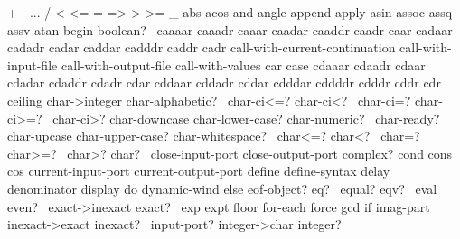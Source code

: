 {\cf *}                       {\cf +}
{\cf -}                       {\cf ...}
{\cf /}                       {\cf <}
{\cf <=}                      {\cf =}
{\cf =>}                      {\cf >}
{\cf >=}                      {\cf \_}
{\cf abs}                     {\cf acos}
{\cf and}                     {\cf angle}
{\cf append}                  {\cf apply}
{\cf asin}                    {\cf assoc}
{\cf assq}                    {\cf assv}
{\cf atan}                    {\cf begin}
{\cf boolean?\ }               {\cf caaaar}
{\cf caaadr}                  {\cf caaar}
{\cf caadar}                  {\cf caaddr}
{\cf caadr}                   {\cf caar}
{\cf cadaar}                  {\cf cadadr}
{\cf cadar}                   {\cf caddar}
{\cf cadddr}                  {\cf caddr}
{\cf cadr}
{\cf call-with-current-continuation}
{\cf call-with-input-file}    {\cf call-with-output-file}
{\cf call-with-values}        {\cf car}
{\cf case}                    {\cf cdaaar}
{\cf cdaadr}                  {\cf cdaar}
{\cf cdadar}                  {\cf cdaddr}
{\cf cdadr}                   {\cf cdar}
{\cf cddaar}                  {\cf cddadr}
{\cf cddar}                   {\cf cdddar}
{\cf cddddr}                  {\cf cdddr}
{\cf cddr}                    {\cf cdr}
{\cf ceiling}                 {\cf char->integer}
{\cf char-alphabetic?\ }       {\cf char-ci<=?}
{\cf char-ci<?\ }              {\cf char-ci=?}
{\cf char-ci>=?\ }             {\cf char-ci>?}
{\cf char-downcase}           {\cf char-lower-case?}
{\cf char-numeric?\ }          {\cf char-ready?}
{\cf char-upcase}             {\cf char-upper-case?}
{\cf char-whitespace?\ }       {\cf char<=?}
{\cf char<?\ }                 {\cf char=?}
{\cf char>=?\ }                {\cf char>?}
{\cf char?\ }                  {\cf close-input-port}
{\cf close-output-port}       {\cf complex?}
{\cf cond}                    {\cf cons}
{\cf cos}                     {\cf current-input-port}
{\cf current-output-port}     {\cf define}
{\cf define-syntax}           {\cf delay}
{\cf denominator}             {\cf display}
{\cf do}                      {\cf dynamic-wind}
{\cf else}                    {\cf eof-object?}
{\cf eq?\ }                    {\cf equal?}
{\cf eqv?\ }                   {\cf eval}
{\cf even?\ }                  {\cf exact->inexact}
{\cf exact?\ }                 {\cf exp}
{\cf expt}                    {\cf floor}
{\cf for-each}                {\cf force}
{\cf gcd}                     {\cf if}
{\cf imag-part}               {\cf inexact->exact}
{\cf inexact?\ }               {\cf input-port?}
{\cf integer->char}           {\cf integer?}
